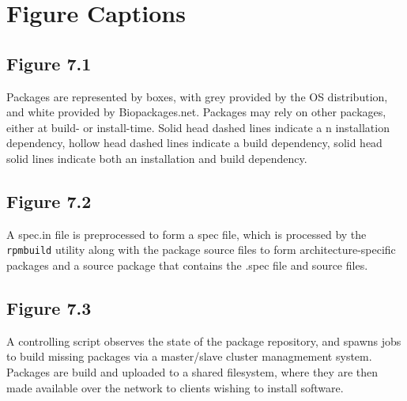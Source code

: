 \section{Figure Captions}

\subsection{Figure 7.1}

Packages are represented by
boxes, with grey provided by the OS distribution, and white provided by
Biopackages.net.  Packages may rely on other packages, either at build- or
install-time.  Solid head dashed lines indicate a n installation dependency,
hollow head dashed lines indicate a build dependency, solid head solid lines
indicate both an installation and build dependency.

\subsection{Figure 7.2}

A spec.in file is preprocessed to form
a spec file, which is processed by the \texttt{rpmbuild} utility along with the
package source files to form architecture-specific packages and a source
package that contains the .spec file and source files.

\subsection{Figure 7.3}

A controlling script
observes the state of the package repository, and spawns jobs to build missing
packages via a master/slave cluster managmement system.  Packages are build and
uploaded to a shared filesystem, where they are then made available over the
network to clients wishing to install software.


% 

